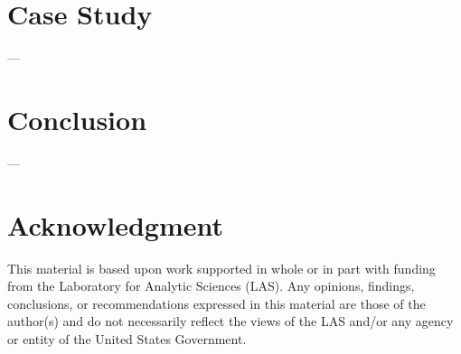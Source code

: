 \documentclass[conference]{IEEEtran}
\begin{document}
\section{Case Study}
---



\section{Conclusion}
--- 




\section*{Acknowledgment}
This material is based upon work supported in whole or in part with funding from the Laboratory for Analytic Sciences (LAS). Any opinions, findings, conclusions, or recommendations expressed in this material are those of the author(s) and do not necessarily reflect the views of the LAS and/or any agency or entity of the United States Government.


%
%
%




\end{document}
